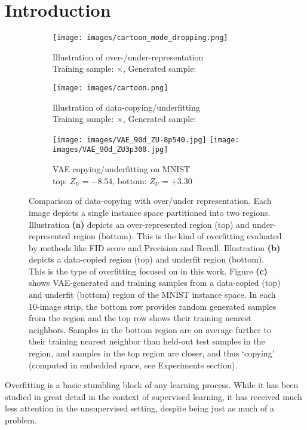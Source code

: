 \section{Introduction}
\begin{figure*}
    \centering
    \begin{subfigure}{.30\linewidth}
        \centering 
        \captionsetup{justification=centering}
        \texttt{[image: images/cartoon\_mode\_dropping.png]}
        \caption{Illustration of over-/under-representation \\ Training sample: $\times$, Generated sample: \textcolor{red}{\textbullet}} \label{fig:cartoon overrep}
    \end{subfigure}
    \hspace{0.1in}
    \begin{subfigure}{.30\linewidth}
        \centering 
        \captionsetup{justification=centering}
        \texttt{[image: images/cartoon.png]}
        \caption{Illustration of data-copying/underfitting \\ Training sample: $\times$, Generated sample: \textcolor{red}{\textbullet}} \label{fig:cartoon data-copying}
    \end{subfigure}
        \hspace{0.1in}
    \begin{subfigure}{.32\linewidth}
        \centering
        \captionsetup{justification=centering}
        \texttt{[image: images/VAE\_90d\_ZU-8p540.jpg]}
        \vspace{0.1in}
        \texttt{[image: images/VAE\_90d\_ZU3p300.jpg]}
        \caption{VAE copying/underfitting on MNIST \\ top: $Z_U = -8.54$, bottom: $Z_U = +3.30$} \label{fig:VAE mnist neighbors}
    \end{subfigure}
    \caption{Comparison of data-copying with over/under representation. Each image depicts a single instance space partitioned into two regions. Illustration \textbf{(a)} depicts an over-represented region (top) and under-represented region (bottom). This is the kind of overfitting evaluated by methods like FID score and Precision and Recall. Illustration \textbf{(b)} depicts a data-copied region (top) and underfit region (bottom). This is the type of overfitting focused on in this work. Figure \textbf{(c)} shows VAE-generated and training samples from a data-copied (top) and underfit (bottom) region of the MNIST instance space. In each 10-image strip, the bottom row provides random generated samples from the region and the top row shows their training nearest neighbors. Samples in the bottom region are on average further to their training nearest neighbor than held-out test samples in the region, and samples in the top region are closer, and thus `copying' (computed in embedded space, see Experiments section). }
    \label{fig:neighbor example}
\end{figure*} 
Overfitting is a basic stumbling block of any learning process. While it has been studied in great detail in the context of supervised learning, it has received much less attention in the unsupervised setting, despite being just as much of a problem.

